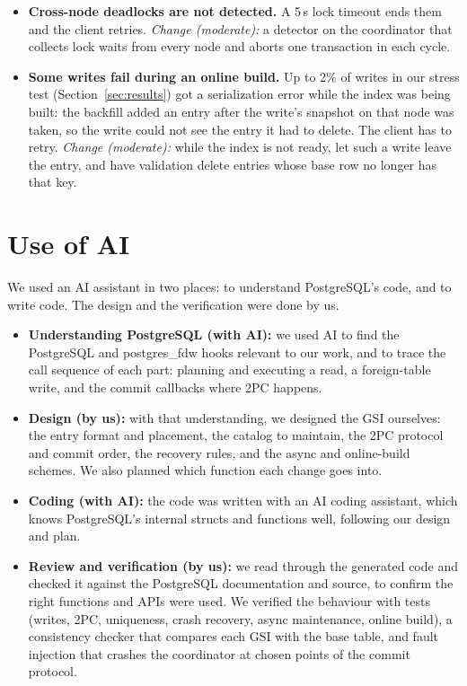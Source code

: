 \documentclass[11pt,a4paper]{article}
\begin{document}
\begin{itemize}
  \item \textbf{Cross-node deadlocks are not detected.} A 5\,s lock timeout ends them and the client
        retries. \emph{Change (moderate):} a detector on the coordinator that collects lock waits from
        every node and aborts one transaction in each cycle.
  \item \textbf{Some writes fail during an online build.} Up to 2\% of writes in our stress test
        (Section~\ref{sec:results}) got a serialization error while the index was being built: the
        backfill added an entry after the write's snapshot on that node was taken, so the write could
        not see the entry it had to delete. The client has to retry. \emph{Change (moderate):} while the
        index is not ready, let such a write leave the entry, and have validation delete entries whose
        base row no longer has that key.
\end{itemize}

\section*{Use of AI}
We used an AI assistant in two places: to understand PostgreSQL's code, and to write code. The design and
the verification were done by us.
\begin{itemize}
  \item \textbf{Understanding PostgreSQL (with AI):} we used AI to find the PostgreSQL and postgres\_fdw
        hooks relevant to our work, and to trace the call sequence of each part: planning and executing
        a read, a foreign-table write, and the commit callbacks where 2PC happens.
  \item \textbf{Design (by us):} with that understanding, we designed the GSI ourselves: the entry
        format and placement, the catalog to maintain, the 2PC protocol and commit order, the recovery
        rules, and the async and online-build schemes. We also planned which function each change goes
        into.
  \item \textbf{Coding (with AI):} the code was written with an AI coding assistant, which knows
        PostgreSQL's internal structs and functions well, following our design and plan.
  \item \textbf{Review and verification (by us):} we read through the generated code and checked it
        against the PostgreSQL documentation and source, to confirm the right functions and APIs were
        used. We verified the behaviour with tests (writes, 2PC, uniqueness, crash recovery, async
        maintenance, online build), a consistency checker that compares each GSI with the base table,
        and fault injection that crashes the coordinator at chosen points of the commit protocol.
\end{itemize}
\end{document}
